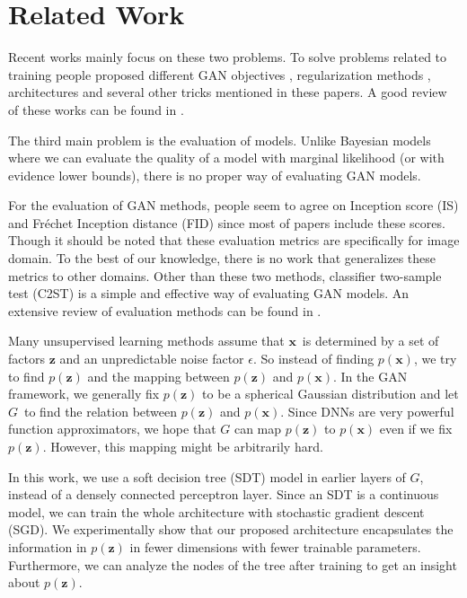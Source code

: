\documentclass[a4paper,onesided,12pt]{report}
\begin{document}
\section{Related Work}
\label{sec:related}

Recent works mainly focus on these two problems. To solve problems related to training people proposed different GAN objectives \cite{wgan,infogan,leastgan,lsgan}, regularization methods \cite{improved_wgan,sngan,dcgan}, architectures \cite{biggan,bigan,ali,proggan,stylegan,dcgan,sagan} and several other tricks mentioned in these papers. A good review of these works can be found in \cite{ganreview,ganreview2,ganreview3}.

The third main problem is the evaluation of models. Unlike Bayesian models where we can evaluate the quality of a model with marginal likelihood (or with evidence lower bounds), there is no proper way of evaluating GAN models.

For the evaluation of GAN methods, people seem to agree on Inception score (IS) \cite{improvedtechniques} and Fr\'echet Inception distance (FID) \cite{twotimes} since most of papers include these scores. Though it should be noted that these evaluation metrics are specifically for image domain. To the best of our knowledge, there is no work that generalizes these metrics to other domains. Other than these two methods, classifier two-sample test (C2ST) \cite{twosample} is a simple and effective way of evaluating GAN models. An extensive review of evaluation methods can be found in \cite{evalreview}.

Many unsupervised learning methods assume that $\boldsymbol{x}$~is determined by a set of factors $\boldsymbol{z}$ and an unpredictable noise factor $\epsilon$. So instead of finding $p(\boldsymbol{x})$, we try to find $p(\boldsymbol{z})$ and the mapping between $p(\boldsymbol{z})$ and $p(\boldsymbol{x})$. In the GAN framework, we generally fix $p(\boldsymbol{z})$ to be a spherical Gaussian distribution and let $G$~to find the relation between $p(\boldsymbol{z})$ and $p(\boldsymbol{x})$. Since DNNs are very powerful function approximators, we hope that $G$ can map $p(\boldsymbol{z})$ to $p(\boldsymbol{x})$ even if we fix $p(\boldsymbol{z})$. However, this mapping might be arbitrarily hard.

In this work, we use a soft decision tree (SDT) model \cite{sdt} in earlier layers of $G$, instead of a densely connected perceptron layer. Since an SDT is a continuous model, we can train the whole architecture with stochastic gradient descent (SGD). We experimentally show that our proposed architecture encapsulates the information in $p(\boldsymbol{z})$ in fewer dimensions with fewer trainable parameters. Furthermore, we can analyze the nodes of the tree after training to get an insight about $p(\boldsymbol{z})$.
\end{document}
